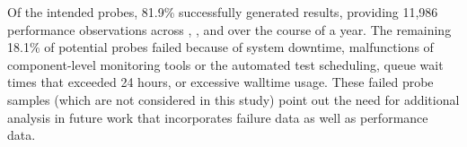 Of the intended probes, 81.9\%  successfully generated results, providing 
11,986 performance observations across \mira, \cori, and \edison over the
course of a year.
The remaining 18.1\% of potential probes failed because of system downtime,
malfunctions of component-level monitoring tools or the automated test
scheduling, queue wait times that exceeded 24 hours, or excessive walltime
usage.  These failed probe samples (which are not considered in this study) point out the need
for additional analysis in future work that incorporates failure data as
well as performance data.
